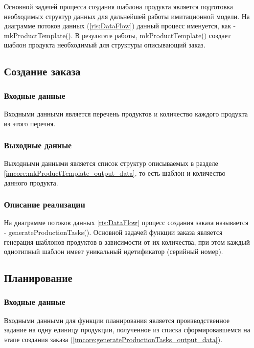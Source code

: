 Основной задачей процесса создания шаблона продукта является подготовка необходимых структур данных для дальнейшей работы имитационной модели. На диаграмме потоков данных (\ref{ris:DataFlow}) данный процесс именуется, как - mkProductTemplate(). В результате работы, mkProductTemplate() создает шаблон продукта необходимый для структуры описывающий заказ.

\subsection{Создание заказа}

\subsubsection{Входные данные}
Входными данными является перечень продуктов и количество каждого продукта из этого перечня.

\label{imcore:generateProductionTasks_output_data}

\subsubsection{Выходные данные}
Выходными данными является список структур описываемых в разделе \ref{imcore:mkProductTemplate_output_data}, то есть шаблон и количество данного продукта.

\subsubsection{Описание реализации}
На диаграмме потоков данных \ref{ris:DataFlow} процесс создания заказа называется - generateProductionTasks(). Основной задачей функции заказа является генерация шаблонов продуктов в зависимости от их количества, при этом каждый однотипный шаблон имеет уникальный идетификатор (серийный номер).


\subsection{Планирование}

\subsubsection{Входные данные}
Входными данными для функции планирования является производственное задание на одну единицу продукции, полученное из списка сформировавшемся на этапе создания заказа (\ref{imcore:generateProductionTasks_output_data}).


